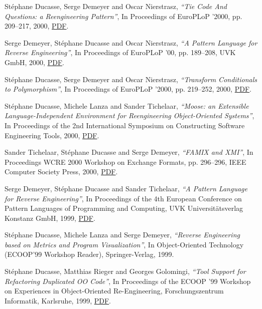 \documentclass{article}
\newcommand{\czauthors}[1]{#1}
\newcommand{\cztitle}[1]{\emph{``#1''}}
\newcommand{\czbooktitle}[1]{#1}
\begin{document}
\begin{itemize}
	\pub  \czauthors{St\'ephane Ducasse, Serge Demeyer and Oscar Nierstrasz},  \cztitle{Tie Code And Questions: a Reengineering Pattern},  In \czbooktitle{Proceedings of EuroPLoP '2000}, pp. 209--217, 2000, \href{http://rmod-files.lille.inria.fr/Team/Texts/Papers/Duca00aTieCode.pdf}{PDF}.

	\pub  \czauthors{Serge Demeyer, St\'ephane Ducasse and Oscar Nierstrasz},  \cztitle{A Pattern Language for Reverse Engineering},  In \czbooktitle{Proceedings of EuroPLoP '00}, pp. 189--208, UVK GmbH, 2000, \href{http://rmod-files.lille.inria.fr/Team/Texts/Papers/Deme00d-RevEng.pdf}{PDF}.

	\pub  \czauthors{St\'ephane Ducasse, Serge Demeyer and Oscar Nierstrasz},  \cztitle{Transform Conditionals to Polymorphism},  In \czbooktitle{Proceedings of EuroPLoP '2000}, pp. 219--252, 2000, \href{http://rmod-files.lille.inria.fr/Team/Texts/Papers/Duca00cTransform.pdf}{PDF}.

	\pub  \czauthors{St\'ephane Ducasse, Michele Lanza and Sander Tichelaar},  \cztitle{Moose: an {Extensible} {Language}-{Independent} {Environment} for {Reengineering} {Object}-{Oriented} {Systems}},  In \czbooktitle{Proceedings of the 2nd International Symposium on Constructing Software Engineering Tools}, 2000, \href{http://rmod-files.lille.inria.fr/Team/Texts/Papers/Duca00bMooseCoset.pdf}{PDF}.

	\pub  \czauthors{Sander Tichelaar, St\'ephane Ducasse and Serge Demeyer},  \cztitle{{FAMIX} and {XMI}},  In \czbooktitle{Proceedings WCRE 2000 Workshop on Exchange Formats}, pp. 296--296, IEEE Computer Society Press, 2000, \href{http://rmod-files.lille.inria.fr/Team/Texts/Papers/Tich00nFamixWCRE2000.pdf}{PDF}.

	\pub  \czauthors{Serge Demeyer, St\'ephane Ducasse and Sander Tichelaar},  \cztitle{A Pattern Language for Reverse Engineering},  In \czbooktitle{Proceedings of the 4th European Conference on Pattern Languages of Programming and Computing}, UVK Universit\"atsverlag Konstanz GmbH, 1999, \href{http://rmod-files.lille.inria.fr/Team/Texts/Papers/Deme99n-Europlop99.pdf}{PDF}.

	\pub  \czauthors{St\'ephane Ducasse, Michele Lanza and Serge Demeyer},  \cztitle{Reverse Engineering based on Metrics and Program Visualization},  In \czbooktitle{Object-Oriented Technology (ECOOP'99 Workshop Reader)}, Springer-Verlag, 1999.

	\pub  \czauthors{St\'ephane Ducasse, Matthias Rieger and Georges Golomingi},  \cztitle{Tool Support for Refactoring Duplicated {OO} Code},  In \czbooktitle{Proceedings of the ECOOP '99 Workshop on Experiences in Object-Oriented Re-Engineering}, Forschungszentrum Informatik, Karlsruhe, 1999, \href{http://rmod-files.lille.inria.fr/Team/Texts/Papers/Rieg99aToolSuppRefacOOCode.pdf}{PDF}.


\end{itemize}
\end{document}
